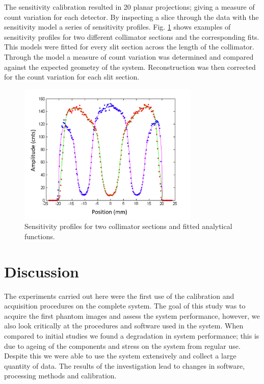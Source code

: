 The sensitivity calibration resulted in 20 planar projections; giving a measure of count variation for each detector. By inspecting a slice through the data with the sensitivity model a series of sensitivity profiles. Fig. \ref{fig:sensprof} shows examples of sensitivity profiles for two different collimator sections and the corresponding fits. This models were fitted for every slit section across the length of the collimator. Through the model a measure of count variation was determined and compared against the expected geometry of the system. Reconstruction was then corrected for the count variation for each slit section. 

\begin{figure}[!t]
\centering
\includegraphics[width=3.4in]{figures/sns_prof.png}
\caption{Sensitivity profiles for two collimator sections and fitted analytical functions.}
\label{fig:sensprof}
\end{figure}

\section{Discussion}
The experiments carried out here were the first use of the calibration and acquisition procedures on the complete system. The goal of this study was to acquire the first phantom images and assess the system performance, however, we also look critically at the procedures and software used in the system. When compared to initial studies \cite{8432104} we found a degradation in system performance; this is due to ageing of the components and stress on the system from regular use. Despite this we were able to use the system extensively and collect a large quantity of data. The results of the investigation lead to changes in software, processing methods and calibration. 
